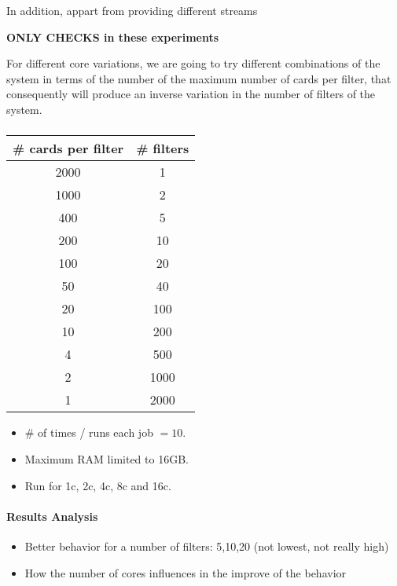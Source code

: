 In addition, appart from providing different streams 


\textbf{ONLY CHECKS in these experiments}

For different core variations, we are going to try different combinations of the system in terms
of the number of the maximum number of cards per filter, that consequently will produce an inverse variation in the number of filters of the system.

\subsubsection*{\smallG}
    
\begin{table}[H]
    \renewcommand{\arraystretch}{1.5} %
    \centering
    \begin{tabular}{|c|c|}
    \hline
    \# cards per filter & \# filters \\ \hline
    2000   &   1     \\ \hline
    1000   &   2     \\ \hline
    400 &   5     \\ \hline
    200  &   10     \\ \hline
    100 &   20    \\ \hline
    50  &   40    \\ \hline
    20  &   100    \\ \hline
    10  &   200    \\ \hline
    4  &   500    \\ \hline
    2  &   1000    \\ \hline
    1  &   2000    \\ \hline
    \end{tabular}
\end{table}
    
\begin{itemize}
    \item \# of times / runs each job $=10$.
    \item Maximum RAM limited to 16GB.
    \item Run for 1c, 2c, 4c, 8c and 16c.
\end{itemize}

\paragraph{Results Analysis\\}

\begin{itemize}
    \item Better behavior for a number of filters: 5,10,20 (not lowest, not really high)
    \item How the number of cores influences in the improve of the behavior
\end{itemize}

